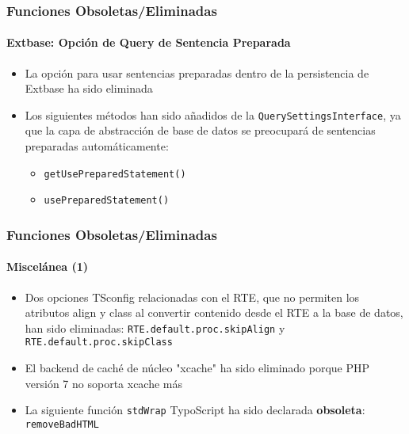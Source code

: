 \begin{frame}[fragile]
	\frametitle{Funciones Obsoletas/Eliminadas}
	\framesubtitle{Extbase: Opción de Query de Sentencia Preparada}

	\begin{itemize}

		\item La opción para usar sentencias preparadas dentro de la persistencia de Extbase ha sido eliminada

		\item Los siguientes métodos han sido añadidos de la \texttt{QuerySettingsInterface},
			ya que la capa de abstracción de base de datos se preocupará de sentencias preparadas automáticamente:

			\begin{itemize}
				\item \texttt{getUsePreparedStatement()}
				\item \texttt{usePreparedStatement()}
			\end{itemize}

	\end{itemize}

\end{frame}


\begin{frame}[fragile]
	\frametitle{Funciones Obsoletas/Eliminadas}
	\framesubtitle{Miscelánea (1)}

	\begin{itemize}

		\item Dos opciones TSconfig relacionadas con el RTE, que no permiten los atributos align y class al convertir
			contenido desde el RTE a la base de datos, han sido eliminadas:\newline
			\small
				\texttt{RTE.default.proc.skipAlign} y \texttt{RTE.default.proc.skipClass}
			\normalsize

		\item El backend de caché de núcleo "xcache" ha sido eliminado porque PHP versión 7 no soporta xcache más

		\item La siguiente función \texttt{stdWrap} TypoScript ha sido declarada \textbf{obsoleta}:
			\texttt{removeBadHTML}

	\end{itemize}

\end{frame}

